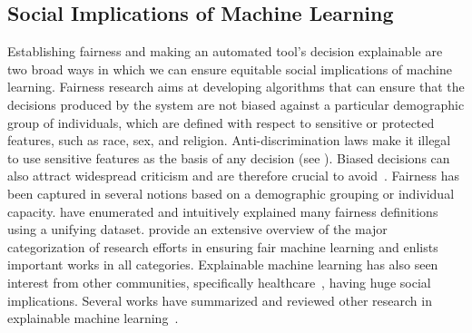 

\subsection{Social Implications of Machine Learning}
Establishing fairness and making an automated tool's decision explainable are two broad ways in which we can ensure equitable social implications of machine learning. 
Fairness research aims at developing algorithms that can ensure that the decisions produced by the system are not biased against a particular demographic group of individuals, which are defined with respect to sensitive or protected features, such as race, sex, and religion.
Anti-discrimination laws make it illegal to use sensitive features as the basis of any decision (see ). Biased decisions can also attract widespread criticism and are therefore crucial to avoid~\cite{prime-racist,apple-sexist}. 
Fairness has been captured in several notions based on a demographic grouping or individual capacity. 
\citet{verma_fairness} have enumerated and intuitively explained many fairness definitions using a unifying dataset. 
\citet{dunkelau_fairness-aware} provide an extensive overview of the major categorization of research efforts in ensuring fair machine learning and enlists important works in all categories. 
Explainable machine learning has also seen interest from other communities, specifically healthcare~\citep{tjoa2019survey1}, having huge social implications. 
Several works have summarized and reviewed other research in explainable machine learning~\citep{xai-survey2,carvalho2019:survey3,xai-survey4}. 

